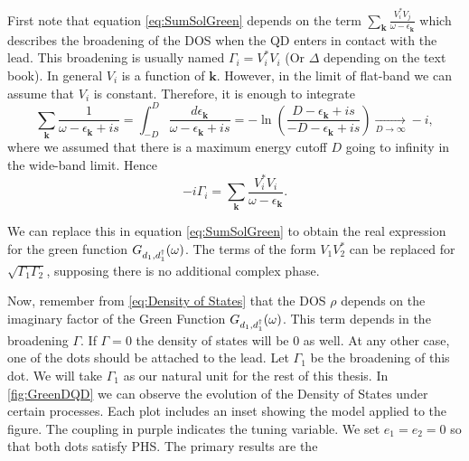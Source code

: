 First note that equation \eqref{eq:SumSolGreen} depends on the term $\sum_{\boldsymbol{k}}\frac{V_{i}^{*}V_{j}}{\omega-\epsilon_{\boldsymbol{k}}}$ which describes the broadening of the DOS when the QD enters in contact with the lead. This broadening is usually named $\Gamma_i=V_{i}^{*}V_{i}$ (Or $\Delta$ depending on the text book). 
In general $V_i$  is a function of $\textbf{k}$. However, in the limit of flat-band we can assume that $V_i $ is constant. Therefore, it is enough to integrate
\begin{equation}
    \sum_{\boldsymbol{k}}\frac{1}{\omega-\epsilon_{\boldsymbol{k}}+is}=\int_{-D}^{D}\frac{d\epsilon_{\boldsymbol{k}}}{\omega-\epsilon_{\boldsymbol{k}}+is}=-\ln\left(\frac{D-\epsilon_{\boldsymbol{k}}+is}{-D-\epsilon_{\boldsymbol{k}}+is}\right)\xrightarrow[D\rightarrow\infty]{}-i , 
\end{equation}
\noindent where we assumed that there is a maximum  energy cutoff $D$ going to infinity in the wide-band limit. Hence 
\begin{equation}
   -i\Gamma_i = \sum_{\boldsymbol{k}}\frac{V_{i}^{*}V_{i}}{\omega-\epsilon_{\boldsymbol{k}}}.
\end{equation}



We can replace this in equation \eqref{eq:SumSolGreen} to obtain the real expression for the green function $G_{d_1,d_1^\dagger}(\omega)$. The terms of the form $V_1V_2^*$ can be replaced for $\sqrt{\Gamma_1\Gamma_2}$, supposing there is no additional complex phase.

Now, remember from \eqref{eq:Density of States} that the DOS $\rho$ depends on the imaginary factor of the Green Function $G_{d_1,d_1^\dagger}(\omega)$. This term depends in the broadening $\Gamma$. If $\Gamma = 0$ the density of states will be $0$ as well. At any other case, one of the dots should be attached to the lead. Let $\Gamma_1$ be the broadening of this dot. We will take $\Gamma_1$ as our natural unit for the rest of this thesis.  
In \ref{fig:GreenDQD} we can observe the evolution of the Density of States under certain processes. Each plot includes an inset showing the model applied to the figure. The coupling in purple indicates the tuning variable. We set $e_1 = e_2 = 0$ so that both dots satisfy PHS. The primary results are the 



